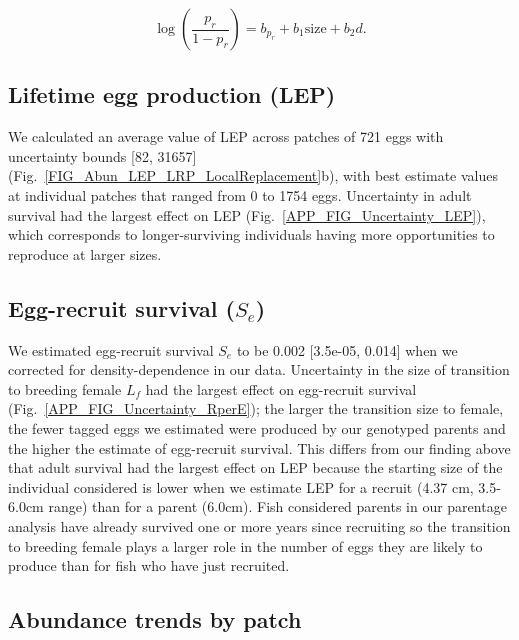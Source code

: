 \documentclass[12pt, oneside]{article}   	%
\begin{document}
\begin{equation}
\log(\frac{p_r}{1-p_r}) = b_{p_r} + b_1\text{size} + b_2d. \label{APP_EQN_MARK_Recapture}
\end{equation}

\subsection{Lifetime egg production (LEP)} \label{APP_SEC_RESULTS_LEP}
We calculated an average value of LEP across patches of 721 eggs with uncertainty bounds [82, 31657] (Fig.\ \ref{FIG_Abun_LEP_LRP_LocalReplacement}b), with best estimate values at individual patches that ranged from 0 to 1754 eggs. Uncertainty in adult survival had the largest effect on LEP (Fig.\ \ref{APP_FIG_Uncertainty_LEP}), which corresponds to longer-surviving individuals having more opportunities to reproduce at larger sizes. 

\subsection{Egg-recruit survival ($S_e$)} \label{APP_SEC_RESULTS_Egg-recruit_survival}

We estimated egg-recruit survival $S_{e}$ to be 0.002 [3.5e-05, 0.014] when we corrected for density-dependence in our data. Uncertainty in the size of transition to breeding female $L_f$ had the largest effect on egg-recruit survival (Fig.\ \ref{APP_FIG_Uncertainty_RperE}); the larger the transition size to female, the fewer tagged eggs we estimated were produced by our genotyped parents and the higher the estimate of egg-recruit survival. This differs from our finding above that adult survival had the largest effect on LEP because the starting size of the individual considered is lower when we estimate LEP for a recruit (4.37 cm, 3.5-6.0cm range) than for a parent (6.0cm). Fish considered parents in our parentage analysis have already survived one or more years since recruiting so the transition to breeding female plays a larger role in the number of eggs they are likely to produce than for fish who have just recruited. 

\subsection{Abundance trends by patch}
\end{document}
